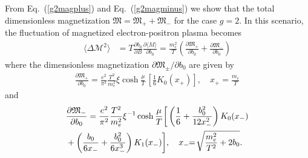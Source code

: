 \documentclass[aps,prd,floatfix,reprint]{revtex4-2}
\begin{document}
{From Eq.~(\ref{g2magplus}) and Eq.~(\ref{g2magminus}) we show that the total dimensionless magnetization ${\mathfrak M}={\mathfrak M}_{+}+{\mathfrak M}_{-}$ for the case $g=2$. In this scenario, the fluctuation of magnetized electron-positron plasma becomes
 \begin{align}\label{Fluctuation}
 \langle\Delta \mathcal{M}^2\rangle&=T\frac{\partial b_0}{\partial B}\frac{\partial {\langle M\rangle} }{\partial b_0}=\frac{m_e^2}{T}\left(\frac{\partial {\mathfrak M}_{+} }{\partial b_0}+\frac{\partial {\mathfrak M} _{-}}{\partial b_0}\right)
 \end{align}
 where the dimensionless magnetization $\partial{\mathfrak M}_{\pm}/\partial b_0$ are given by
 \begin{align}
 \frac{\partial {\mathfrak M}_{+} }{\partial b_0}=\frac{e^{2}}{\pi^{2}}\frac{T^{2}}{m_{e}^{2}}\xi\cosh{\frac{\mu}{T}}\,\left[\frac{1}{6}K_{0}(x_{+})\right],\quad x_{+}=\frac{m_{e}}{T}
 \end{align}
 and 
 \begin{align}
  &\frac{\partial {\mathfrak M}_{-} }{\partial b_0}=\frac{e^{2}}{\pi^{2}}\frac{T^{2}}{m_{e}^{2}}\xi^{-1}\cosh{\frac{\mu}{T}}\bigg[\left(\frac{1}{6}+\frac{b^2_0}{12x^2_{-}}\right)K_0(x_{-})\notag\\
  &+\left(\frac{b_0}{6x_{-}}+\frac{b^2_0}{6x^3_{-}}\right)K_1(x_{-})\bigg],\quad  x_{-}\!\!=\!\sqrt{\frac{m_{e}^{2}}{T^{2}}+2b_{0}}.
 \end{align}
 
}
\end{document}
